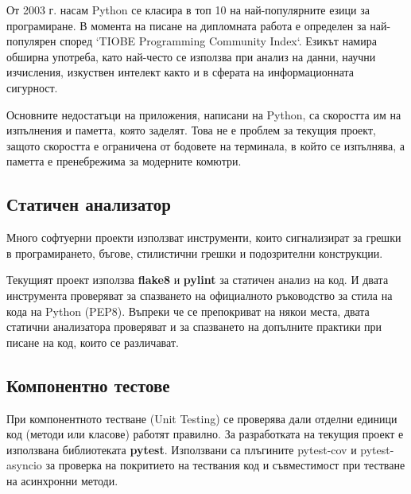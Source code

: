                 От 2003 г. насам Python се класира в топ 10 на най-популярните
                езици за програмиране. В момента на писане на дипломната работа
                е определен за най-популярен според `TIOBE Programming 
                Community Index`. Езикът намира обширна употреба, като 
                най-често се използва при анализ на данни, научни изчисления, 
                изкуствен интелект както и в сферата на информационната 
                сигурност.  \cite{TIOBE}

                Основните недостатъци на приложения, написани на Python, са 
                скоростта им на изпълнения и паметта, която заделят. Това не е
                проблем за текущия проект, защото скоростта е ограничена от
                бодовете на терминала, в който се изпълнява, а паметта е 
                пренебрежима за модерните комютри. 

        \subsection{Статичен анализатор}
                
                Много софтуерни проекти използват инструменти, които 
                сигнализират за грешки в програмирането, бъгове, стилистични
                грешки и подозрителни конструкции.

                Текущият проект използва \textbf{flake8} и \textbf{pylint} за
                статичен анализ на  код. И двата инструмента проверяват за
                спазването на официалното ръководство за стила на кода на
                Python (PEP8). Въпреки че се препокриват на някои места, двата
                статични анализатора проверяват и за спазването на допълните
                практики при писане на код, които се различават.
        \subsection {Компонентно тестове}
                
                При компонентното тестване (Unit Testing) се проверява дали 
                отделни единици код (методи или класове) работят правилно. За
                разработката на текущия проект е използвана библиотеката
                \textbf{pytest}. Използвани са плъгините pytest-cov и
                pytest-asyncio за проверка на покритието на тествания код и
                съвместимост при тестване на асинхронни методи.

